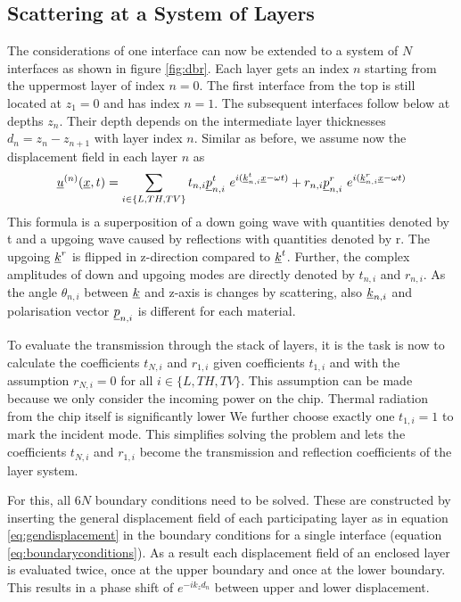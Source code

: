 \subsection{Scattering at a System of Layers}
The considerations of one interface can now be extended to a system of $N$
interfaces as shown in figure \ref{fig:dbr}. Each layer gets an index $n$
starting from the uppermost layer of index $n=0$. The first interface from the
top is still located at $z_1=0$ and has index $n=1$. The subsequent interfaces
follow below at depths $z_n$. Their depth depends on the intermediate layer
thicknesses $d_n=z_n-z_{n+1}$ with layer index $n$.
Similar as before, we assume now the displacement field in each layer $n$ as
\begin{equation} \label{eq:gendisplacement}
    \underline{u}^{(n)}(\underline{x},t)= \sum\limits_{i\in\{L,TH,TV\}} t_{n,i}
    \underline{p}_{n,i}^t\ e^{i(\underline{k}_{n,i}^t\underline{x} - \omega t)}
    + r_{n,i} \underline{p}_{n,i}^r\ e^{i(\underline{k}_{n,i}^r\underline{x} - \omega t)}
\end{equation} %
This formula is a superposition of a down going wave with quantities denoted by
t and a upgoing wave caused by reflections with quantities denoted by r. The
upgoing $\underline{k}^r$ is flipped in z-direction compared to $\underline{k}^t$.
Further, the complex amplitudes of down and upgoing modes are directly denoted
by $t_{n,i}$ and $r_{n,i}$. As
the angle $\theta_{n,i}$ between $\underline{k}$ and z-axis is changes by
scattering, also $\underline{k}_{n,i}$ and polarisation vector $\underline{p}_{n,i}$ is
different for each material. %

To evaluate the transmission through the stack of layers, it is the task is now
to calculate the coefficients $t_{N,i}$ and $r_{1,i}$ given coefficients
$t_{1,i}$ and with the assumption $r_{N,i}=0$ for all $i\in\{L,TH,TV\}$.
This assumption can be made because we only consider the incoming power on the
chip. Thermal radiation from the chip itself is significantly lower We
further choose exactly one $t_{1,i}=1$ to mark the incident mode. This
simplifies solving the problem and lets the coefficients $t_{N,i}$ and
$r_{1,i}$ become the transmission and reflection coefficients of the layer
system.

For this, all $6N$ boundary conditions need to be solved. These are constructed
by inserting the general displacement field of each participating layer as in
equation \ref{eq:gendisplacement} in the boundary conditions for a single
interface (equation \ref{eq:boundaryconditions}). As a result each displacement
field of an enclosed layer is evaluated twice, once at the upper boundary and
once at the lower boundary. This results in a phase shift of $e^{-ik_zd_n}$
between upper and lower displacement.

